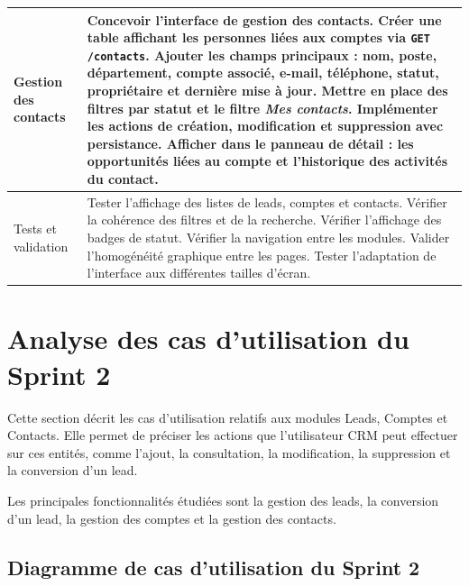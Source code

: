 \documentclass[12pt,a4paper,twoside,openany]{book}
\begin{document}
\begin{table}[h]
{\begin{tabular}{|p{4cm}|p{10.5cm}|}
Gestion des contacts
&
Concevoir l’interface de gestion des contacts. \newline
Créer une table affichant les personnes liées aux comptes via \texttt{GET /contacts}. \newline
Ajouter les champs principaux : nom, poste, département, compte associé, e-mail, téléphone, statut, propriétaire et dernière mise à jour. \newline
Mettre en place des filtres par statut et le filtre \textit{Mes contacts}. \newline
Implémenter les actions de création, modification et suppression avec persistance. \newline
Afficher dans le panneau de détail : les opportunités liées au compte et l’historique des activités du contact. \\
\hline

Tests et validation
&
Tester l’affichage des listes de leads, comptes et contacts. \newline
Vérifier la cohérence des filtres et de la recherche. \newline
Vérifier l’affichage des badges de statut. \newline
Vérifier la navigation entre les modules. \newline
Valider l’homogénéité graphique entre les pages. \newline
Tester l’adaptation de l’interface aux différentes tailles d’écran. \\
\hline

\end{tabular}
}
\end{table}

\section{Analyse des cas d’utilisation du Sprint 2}

Cette section décrit les cas d’utilisation relatifs aux modules Leads, Comptes et Contacts. Elle permet de préciser les actions que l’utilisateur CRM peut effectuer sur ces entités, comme l’ajout, la consultation, la modification, la suppression et la conversion d’un lead.

Les principales fonctionnalités étudiées sont la gestion des leads, la conversion d’un lead, la gestion des comptes et la gestion des contacts.

\subsection{Diagramme de cas d’utilisation du Sprint 2}
\end{document}
